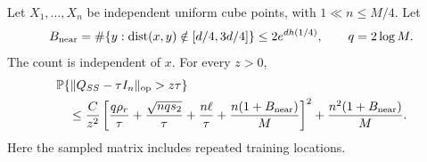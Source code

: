 \begin{lemma}\label{lem:gram-general}
Let $X_1,\ldots,X_n$ be independent uniform cube points, with
$1\ll n\le M/4$. Let
\[
 B_{\mathrm{near}}=\#\{y:\operatorname{dist}(x,y)\notin[d/4,3d/4]\}
 \le 2e^{d h(1/4)},\qquad q=2\log M.
\]
The count is independent of $x$. For every $z>0$,
\begin{align}
 &\mathbb P\{\|Q_{SS}-\tau I_n\|_{\mathrm{op}}>z\tau\}
 \notag\\
 &\quad\le\frac C{z^2}
 \left[\frac{q\rho_r}{\tau}
       +\frac{\sqrt{nq s_2}}{\tau}
       +\frac{n\ell}{\tau}
       +\frac{n(1+B_{\mathrm{near}})}M\right]^2
       +\frac{n^2(1+B_{\mathrm{near}})}M.
 \label{eq:gram-bound}
\end{align}
Here the sampled matrix includes repeated training locations.
\end{lemma}
